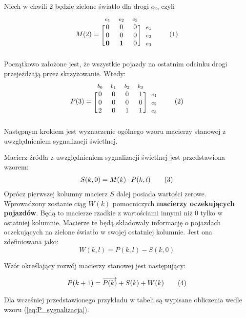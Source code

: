 \documentclass[12pt]{book}
\newcommand\addtag{\refstepcounter{equation}
\tag{\theequation}}
\begin{document}
Niech w chwili 2 będzie zielone światło dla drogi $e_2$, czyli
\begin{equation*}
  M(2)=
  \begin{blockarray}{*{3}{c} l}
    \begin{block}{*{3}{>{$\footnotesize}c<{$}} l}
     $e_1$ & $e_2$ & $e_3$\\
    \end{block}
    \begin{block}{[*{3}{c}]>{$\footnotesize}l<{$}}
       0 & 0 & 0 & $e_1$ \\
       0 & 0 & 0 & $e_2$ \\
       \textbf{0} & \textbf{1} & 0 & $e_3$ \\
    \end{block}
  \end{blockarray} \addtag
\end{equation*}
Początkowo założone jest, że wszystkie pojazdy na ostatnim odcinku drogi przejeżdżają przez skrzyżowanie. Wtedy:
\begin{equation*}
  P(3)=
  \begin{blockarray}{*{4}{c} l}
    \begin{block}{*{4}{>{$\footnotesize}c<{$}} l}
      $b_0$ & $b_1$ & $b_2$ & $b_3$ \\
    \end{block}
    \begin{block}{[*{4}{c}]>{$\footnotesize}l<{$}}
       0 & 0 & 0 & 1 & $e_1$ \\
       0 & 0 & 0 & 0 & $e_2$ \\
       2 & 0 & 1 & 1 & $e_3$ \\
    \end{block}
  \end{blockarray} \addtag \label{skrz_1_zmiennaStanu_0_sygnalizacja}
\end{equation*}
Następnym krokiem jest wyznaczenie ogólnego wzoru macierzy stanowej z uwzględnieniem sygnalizacji świetlnej. 
\begin{tcolorbox}
Macierz źródła z uwzględnieniem sygnalizacji świetlnej jest przedstawiona wzorem:
\[S(k,0)=M(k) \cdot P(k,l) \addtag \label{eq:S} \]
Oprócz pierwszej kolumny macierz $S$ dalej posiada wartości zerowe.\\
Wprowadzony zostanie ciąg $W(k)$ pomocniczych \textbf{macierzy oczekujących pojazdów}. Będą to macierze rzadkie z wartościami innymi niż 0 tylko w ostatniej kolumnie. Macierze te będą składowały informację o pojazdach oczekujących na zielone światło w swojej ostatniej kolumnie. Jest ona zdefiniowana jako:
\[W(k,l)=P(k,l)-S(k,0)\]

Wzór określający rozwój macierzy stanowej jest następujący:

\[P(k+1)=\overrightarrow{P(k)} + S(k) + W(k) \addtag \label{eq:P_sygnalizacja}\]
\end{tcolorbox}
\newpage 
Dla wcześniej przedstawionego przykładu w tabeli są wypisane obliczenia wedle wzoru (\ref{eq:P_sygnalizacja}).
\end{document}
